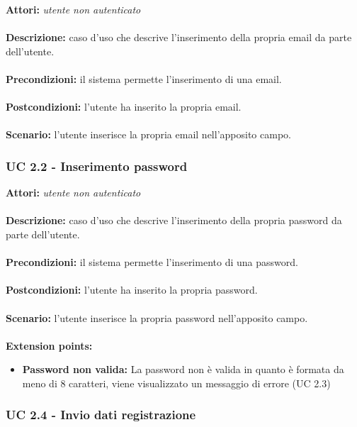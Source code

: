 \documentclass[a4paper,11pt]{article}
\begin{document}
\textbf{Attori:} \textit{utente non autenticato}
\\ \\
\textbf{Descrizione:} caso d'uso che descrive l'inserimento della propria email da parte dell'utente.\\
\\
\textbf{Precondizioni:} il sistema permette l'inserimento di una email.\\
\\
\textbf{Postcondizioni:} l’utente ha inserito la propria email.\\
\\
\textbf{Scenario:} l’utente inserisce la propria email nell'apposito campo.\\


\subsubsection{UC 2.2 - Inserimento password}

\textbf{Attori:} \textit{utente non autenticato}
\\ \\
\textbf{Descrizione:} caso d'uso che descrive l'inserimento della propria password da parte dell'utente.\\
\\
\textbf{Precondizioni:} il sistema permette l'inserimento di una password.\\
\\
\textbf{Postcondizioni:} l’utente ha inserito la propria password.\\
\\
\textbf{Scenario:} l’utente inserisce la propria password nell'apposito campo.\\
\\
\textbf{Extension points:} 
\begin{itemize}
	\item \textbf{Password non valida:} La password non è valida in quanto è formata da meno di 8 caratteri, viene visualizzato un messaggio di errore (UC 2.3)
\end{itemize}


\subsubsection{UC 2.4 - Invio dati registrazione}
\end{document}
